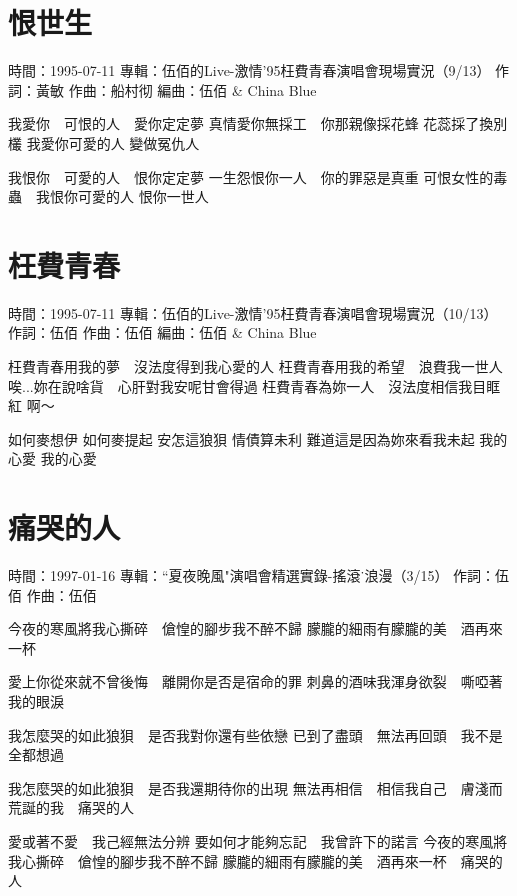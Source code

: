 \documentclass[UTF8,a4paper,oneside,twocolumn,12pt]{ctexbook}
\newcommand{\infopair}[2]{\textbullet #1：#2}
\newcommand{\zc}[1][伍佰]{\infopair{作詞}{#1}}
\newcommand{\zq}[1][伍佰]{\infopair{作曲}{#1}}
\newcommand{\bq}[1][伍佰]{\infopair{編曲}{#1}}
\newcommand{\zj}[1]{\infopair{專輯}{#1}}
\newcommand{\sj}[1]{\infopair{時間}{#1}}
\newenvironment{info}{\begin{flushleft}\kaishu
	}
	{\end{flushleft}\normalsize\yahei\par}
\newenvironment{lyric}{
	}
{}
\begin{document}
\section{恨世生}
\begin{info}
	\sj{1995-07-11}
	\zj{伍佰的Live-激情'95枉費青春演唱會現場實況（9/13）}
	\zc[黃敏]
	\zq[船村彻]
	\bq[伍佰 \& China Blue]
\end{info}
\begin{lyric}
	我愛你　可恨的人　愛你定定夢
	真情愛你無採工　你那親像採花蜂
	花蕊採了換別欉 我愛你可愛的人
	變做冤仇人

	我恨你　可愛的人　恨你定定夢
	一生怨恨你一人　你的罪惡是真重
	可恨女性的毒蟲　我恨你可愛的人
	恨你一世人
\end{lyric}

\section{枉費青春}
\begin{info}
	\sj{1995-07-11}
	\zj{伍佰的Live-激情'95枉費青春演唱會現場實況（10/13）}
	\zc
	\zq
	\bq[伍佰 \& China Blue]
\end{info}
\begin{lyric}
	枉費青春用我的夢　沒法度得到我心愛的人
	枉費青春用我的希望　浪費我一世人
	唉...妳在說啥貨　心肝對我安呢甘會得過
	枉費青春為妳一人　沒法度相信我目眶紅
	啊～

	如何麥想伊
	如何麥提起
	安怎這狼狽
	情債算未利
	難道這是因為妳來看我未起
	我的心愛
	我的心愛
\end{lyric}

\section{痛哭的人}
\begin{info}
	\sj{1997-01-16}
	\zj{``夏夜晚風"演唱會精選實錄-搖滾˙浪漫（3/15）}
	\zc
	\zq
\end{info}
\begin{lyric}
	今夜的寒風將我心撕碎　傖惶的腳步我不醉不歸
	朦朧的細雨有朦朧的美　酒再來一杯

	愛上你從來就不曾後悔　離開你是否是宿命的罪
	刺鼻的酒味我渾身欲裂　嘶啞著我的眼淚

	我怎麼哭的如此狼狽　是否我對你還有些依戀
	已到了盡頭　無法再回頭　我不是全都想過

	我怎麼哭的如此狼狽　是否我還期待你的出現
	無法再相信　相信我自己　膚淺而荒誕的我　痛哭的人

	愛或著不愛　我己經無法分辨
	要如何才能夠忘記　我曾許下的諾言
	今夜的寒風將我心撕碎　傖惶的腳步我不醉不歸
	朦朧的細雨有朦朧的美　酒再來一杯　痛哭的人
\end{lyric}
\end{document}
